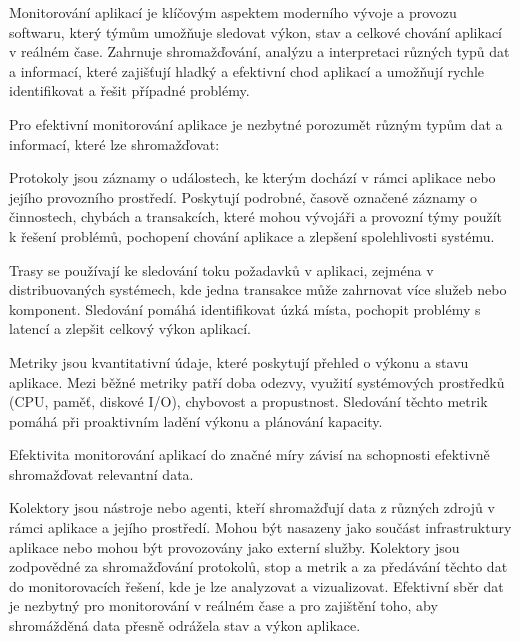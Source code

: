 
Monitorování aplikací je klíčovým aspektem moderního vývoje a provozu softwaru, který týmům umožňuje sledovat výkon, stav a celkové chování aplikací v reálném čase. Zahrnuje shromažďování, analýzu a interpretaci různých typů dat a informací, které zajišťují hladký a efektivní chod aplikací a umožňují rychle identifikovat a řešit případné problémy.


Pro efektivní monitorování aplikace je nezbytné porozumět různým typům dat a informací, které lze shromažďovat:


Protokoly jsou záznamy o událostech, ke kterým dochází v rámci aplikace nebo jejího provozního prostředí. Poskytují podrobné, časově označené záznamy o činnostech, chybách a transakcích, které mohou vývojáři a provozní týmy použít k řešení problémů, pochopení chování aplikace a zlepšení spolehlivosti systému.


Trasy se používají ke sledování toku požadavků v aplikaci, zejména v distribuovaných systémech, kde jedna transakce může zahrnovat více služeb nebo komponent. Sledování pomáhá identifikovat úzká místa, pochopit problémy s latencí a zlepšit celkový výkon aplikací.


Metriky jsou kvantitativní údaje, které poskytují přehled o výkonu a stavu aplikace. Mezi běžné metriky patří doba odezvy, využití systémových prostředků (CPU, paměť, diskové I/O), chybovost a propustnost. Sledování těchto metrik pomáhá při proaktivním ladění výkonu a plánování kapacity.


Efektivita monitorování aplikací do značné míry závisí na schopnosti efektivně shromažďovat relevantní data.


Kolektory jsou nástroje nebo agenti, kteří shromažďují data z různých zdrojů v rámci aplikace a jejího prostředí. Mohou být nasazeny jako součást infrastruktury aplikace nebo mohou být provozovány jako externí služby. Kolektory jsou zodpovědné za shromažďování protokolů, stop a metrik a za předávání těchto dat do monitorovacích řešení, kde je lze analyzovat a vizualizovat. Efektivní sběr dat je nezbytný pro monitorování v reálném čase a pro zajištění toho, aby shromážděná data přesně odrážela stav a výkon aplikace.

